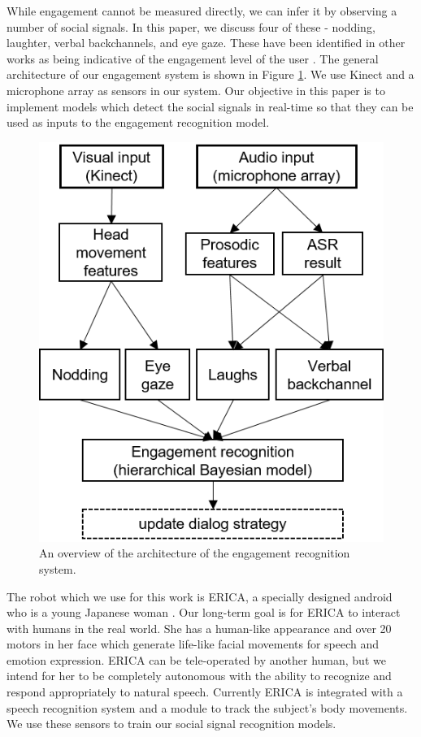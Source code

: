 \documentclass[letterpaper]{article} %
\begin{document}
While engagement cannot be measured directly, we can infer it by observing a number of social signals. In this paper, we discuss four of these - nodding, laughter, verbal backchannels, and eye gaze. These have been identified in other works as being indicative of the engagement level of the user \cite{Rich2010,Xu2013,Oertel2015}. The general architecture of our engagement system is shown in Figure \ref{engagementmodel}. We use Kinect and a microphone array as sensors in our system. Our objective in this paper is to implement models which detect the social signals in real-time so that they can be used as inputs to the engagement recognition model.

\begin{figure}
	\centering
		\includegraphics{engagementmodel.png}
	\caption{An overview of the architecture of the engagement recognition system.}
		\label{engagementmodel}
\end{figure}

The robot which we use for this work is ERICA, a specially designed android who is a young Japanese woman \cite{Glas2016}. Our long-term goal is for ERICA to interact with humans in the real world. She has a human-like appearance and over 20 motors in her face which generate life-like facial movements for speech and emotion expression. ERICA can be tele-operated by another human, but we intend for her to be completely autonomous with the ability to recognize and respond appropriately to natural speech. Currently ERICA is integrated with a speech recognition system and a module to track the subject's body movements. We use these sensors to train our social signal recognition models.
\end{document}
